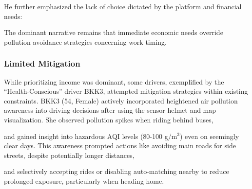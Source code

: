 \qpadding
{}
\qpadding

He further emphasized the lack of choice dictated by the platform and financial needs:

\qpadding
{}
\qpadding



The dominant narrative remains that immediate economic needs override pollution avoidance strategies concerning work timing.

\subsubsection{Limited Mitigation}
While prioritizing income was dominant, some drivers, exemplified by the ``Health-Conscious'' driver BKK3, attempted mitigation strategies within existing constraints.
BKK3 (54, Female) actively incorporated heightened air pollution awareness into driving decisions after using the sensor helmet and map visualization.
She observed pollution spikes when riding behind buses,

\qpadding
{}
\qpadding

and gained insight into hazardous AQI levels (80-100 \textmu{}g/m$^3$) even on seemingly clear days. This awareness prompted actions like avoiding main roads for side streets, despite potentially longer distances,

\qpadding
{}
\qpadding

and selectively accepting rides or disabling auto-matching nearby to reduce prolonged exposure, particularly when heading home.


